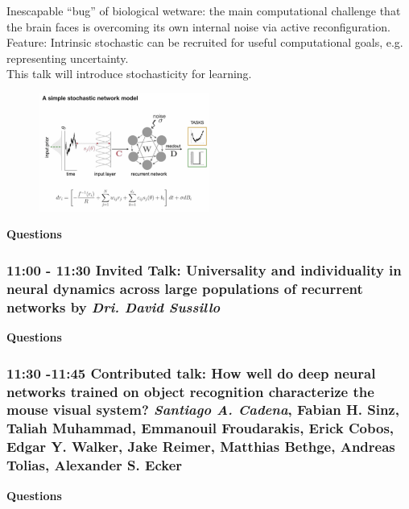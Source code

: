 \documentclass[12pt]{article}
\begin{document}
Inescapable ``bug'' of biological wetware: the main computational challenge that the brain faces is overcoming its own internal noise via active reconfiguration. \\

Feature: Intrinsic stochastic can be recruited for useful computational goals, e.g. representing uncertainty.  \\

This talk will introduce stochasticity for learning. \\

\begin{figure}
  \centering
      \includegraphics[width=0.5\textwidth]{images/stochnn.png}
  \caption{}
\end{figure}

\textbf{Questions} 


\subsubsection{11:00 - 11:30 Invited Talk: Universality and individuality in neural dynamics across large populations of recurrent networks by \textit{Dri. David Sussillo}}

\textbf{Questions} 


\subsubsection{11:30 -11:45 Contributed talk: How well do deep neural networks trained on object recognition characterize the mouse visual system? \textit{Santiago A. Cadena}, Fabian H. Sinz, Taliah Muhammad, Emmanouil Froudarakis, Erick Cobos, Edgar Y. Walker, Jake Reimer, Matthias Bethge, Andreas Tolias, Alexander S. Ecker}

\textbf{Questions} 

\end{document}
